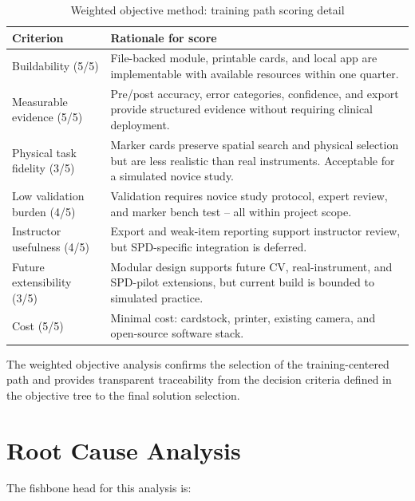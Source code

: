 \documentclass[10pt,a4paper]{article}
\begin{document}
\begin{table}[H]
\centering
\caption{Weighted objective method: training path scoring detail}
\label{tab:weighted-objective-scoring-detail}
\small\renewcommand{\arraystretch}{1.2}\setlength{\tabcolsep}{4pt}
\begin{tabularx}{\textwidth}{|>{\raggedright\arraybackslash}X|>{\raggedright\arraybackslash}X|}
\hline
Criterion & Rationale for score \\
\hline
Buildability (5/5) & File-backed module, printable cards, and local app are implementable with available resources within one quarter. \\
\hline
Measurable evidence (5/5) & Pre/post accuracy, error categories, confidence, and export provide structured evidence without requiring clinical deployment. \\
\hline
Physical task fidelity (3/5) & Marker cards preserve spatial search and physical selection but are less realistic than real instruments. Acceptable for a simulated novice study. \\
\hline
Low validation burden (4/5) & Validation requires novice study protocol, expert review, and marker bench test -- all within project scope. \\
\hline
Instructor usefulness (4/5) & Export and weak-item reporting support instructor review, but SPD-specific integration is deferred. \\
\hline
Future extensibility (3/5) & Modular design supports future CV, real-instrument, and SPD-pilot extensions, but current build is bounded to simulated practice. \\
\hline
Cost (5/5) & Minimal cost: cardstock, printer, existing camera, and open-source software stack. \\
\hline
\end{tabularx}
\end{table}

The weighted objective analysis confirms the selection of the training-centered
path and provides transparent traceability from the decision criteria defined
in the objective tree to the final solution selection.




\section{Root Cause Analysis}
\label{sec:root-cause-analysis}
The fishbone head for this analysis is:
\end{document}
